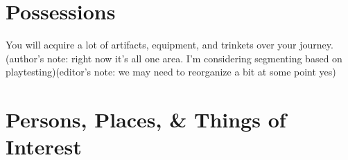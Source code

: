\section{Possessions}\label{sec:possessions}
You will acquire a lot of artifacts, equipment, and trinkets over your journey. (author's note: right now it's all one area. I'm considering segmenting based on playtesting)(editor's note: we may need to reorganize a bit at some point yes)

\section{Persons, Places, \& Things of Interest}\label{sec:interests}
